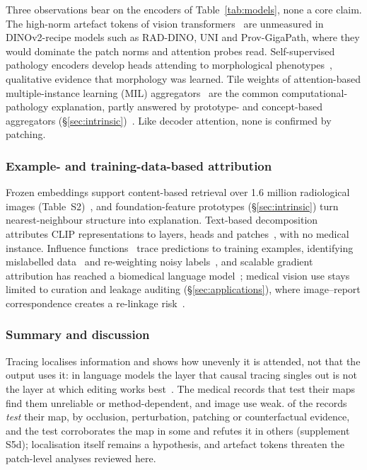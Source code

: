 Three observations bear on the encoders of Table~\ref{tab:models}, none a core claim. The high-norm
artefact tokens of vision transformers~\cite{darcet2023vision} are unmeasured in DINOv2-recipe
models such as RAD-DINO, UNI and Prov-GigaPath, where they would dominate the patch norms and
attention probes read. Self-supervised pathology encoders develop heads attending to morphological
phenotypes~\cite{chen2022self,chen2024generalpurpose,xu2024wholeslide}, qualitative evidence that
morphology was learned. Tile weights of attention-based multiple-instance learning (MIL)
aggregators~\cite{ilse2018attention,lu2020data} are the common computational-pathology explanation,
partly answered by prototype- and concept-based aggregators
(\S\ref{sec:intrinsic})~\cite{song2024morphological,huy2025interactive}. Like decoder attention,
none is confirmed by patching.

\subsubsection{Example- and training-data-based attribution}

Frozen embeddings support content-based retrieval over 1.6 million radiological images
(Table~S2)~\cite{denner2024leveraging}, and foundation-feature prototypes (\S\ref{sec:intrinsic})
turn nearest-neighbour structure into explanation. Text-based decomposition attributes CLIP
representations to layers, heads and
patches~\cite{gandelsman2023interpreting,balasubramanian2024decomposing}, with no medical instance.
Influence functions~\cite{koh2017influence} trace predictions to training examples, identifying mislabelled
data~\cite{hao2020inaccurate} and re-weighting noisy labels~\cite{braun2022influence}, and scalable
gradient attribution has reached a biomedical language model~\cite{cao2026scalable}; medical vision
use stays limited to curation and leakage auditing (\S\ref{sec:applications}), where image--report
correspondence creates a re-linkage risk~\cite{tayebiarasteh2026crossmodal}.


\subsubsection{Summary and discussion}

Tracing localises information and shows how unevenly it is attended, not that the output uses it: in
language models the layer that causal tracing singles out is not the layer at which editing works
best~\cite{hase2023does}. The medical records that test their maps find them unreliable or
method-dependent, and image use weak. \Vtrany{} of the \Vtrn{} records
\emph{test} their map, by occlusion, perturbation, patching or counterfactual evidence, and the test
corroborates the map in some and refutes it in others (supplement S5d); localisation itself remains a hypothesis, and artefact tokens threaten the
patch-level analyses reviewed here.
